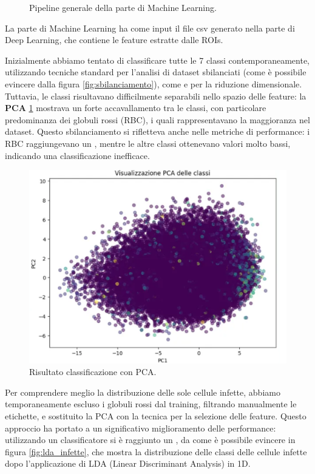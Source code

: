 \documentclass[minted, draw]{../tex/hebdomon}
\begin{document}
%
\begin{figure}[H]
	\centering
	
	\caption{Pipeline generale della parte di Machine Learning.}
\end{figure}
%
La parte di Machine Learning ha come input il file csv generato nella parte di Deep Learning, che contiene le feature estratte dalle ROIs.


Inizialmente abbiamo tentato di classificare tutte le 7 classi contemporaneamente, utilizzando tecniche standard per l’analisi di dataset sbilanciati (come è possibile evincere dalla figura \ref{fig:sbilanciamento}), come  e  per la riduzione dimensionale. Tuttavia, le classi risultavano difficilmente separabili nello spazio delle feature: la \textbf{PCA} \ref{fig:pca_result}  mostrava un forte accavallamento tra le classi, con particolare predominanza dei globuli rossi (RBC), i quali rappresentavano la maggioranza nel dataset. Questo sbilanciamento si rifletteva anche nelle metriche di performance: i RBC raggiungevano un , mentre le altre classi ottenevano valori molto bassi, indicando una classificazione inefficace.

%
\begin{figure}[H]
	\centering
	\includegraphics[width=.5\linewidth]{figures/pca_result.png}
	\caption{Risultato classificazione con PCA.}
	\label{fig:pca_result}
\end{figure}
%


Per comprendere meglio la distribuzione delle sole cellule infette, abbiamo temporaneamente escluso i globuli rossi dal training, filtrando manualmente le etichette, e sostituito la PCA con la tecnica  per la selezione delle feature. Questo approccio ha portato a un significativo miglioramento delle performance: utilizzando un classificatore  si è raggiunto un , da come è possibile evincere in figura \ref{fig:lda_infette}, che mostra la distribuzione delle classi delle cellule infette dopo l’applicazione di LDA (Linear Discriminant Analysis) in 1D.
\end{document}
